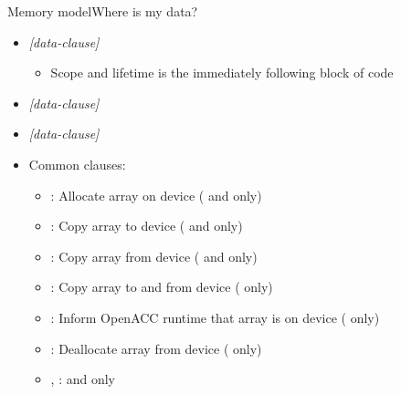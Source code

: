 \documentclass[12pt,aspectratio=169]{beamer}
\begin{document}
\begin{frame}[fragile]{Memory model}{Where is my data?}
  \begin{itemize}
  \item {} \emph{[data-clause]}
    \begin{itemize}
    \item Scope and lifetime is the immediately following block of code
    \end{itemize}
  \item {} \emph{[data-clause]}
  \item {} \emph{[data-clause]}
  \item Common clauses:
    \begin{itemize}
    \item {}: Allocate array  on device
      ( and  only)
    \item {}: Copy array  to device
      ( and  only)
    \item {}: Copy array  from device
      ( and  only)
    \item {}: Copy array  to and from device
      ( only)
    \item {}: Inform OpenACC runtime that array
       is on device
      ( only)
    \item {}: Deallocate array  from
      device ( only)
    \item {}, : 
      and  only
    \end{itemize}
  \end{itemize}
\end{frame}
\end{document}
